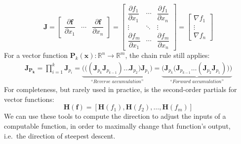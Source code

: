 \documentclass[12pt,initial,twoside,maitrise]{dms}
\numberwithin{equation}{section}
\numberwithin{table}{chapter}
\numberwithin{figure}{chapter}
\begin{document}
\begin{equation}
\mathbf J = \begin{bmatrix}
                       \dfrac{\partial \mathbf{f}}{\partial x_1} & \cdots & \dfrac{\partial \mathbf{f}}{\partial x_n} \end{bmatrix}
= \begin{bmatrix}
      \dfrac{\partial f_1}{\partial x_1} & \cdots & \dfrac{\partial f_1}{\partial x_n}\\
      \vdots & \ddots & \vdots\\
      \dfrac{\partial f_m}{\partial x_1} & \cdots & \dfrac{\partial f_m}{\partial x_n} \end{bmatrix}
    = \begin{bmatrix}
          \nabla f_1 \\
          \vdots \\
          \nabla f_n \end{bmatrix}
\end{equation}
%
For a vector function $\mathbf{P}_k(\mathbf{x}): \mathbb{R}^n\rightarrow\mathbb{R}^m$, the chain rule still applies:
%
\begin{align*}
\mathbf{J}_\mathbf{P_k} = \displaystyle \prod_{i=1}^{k} \mathbf{J}_{p_i} = \underbrace{\bigg(\Big((\mathbf{J}_{p_k} \mathbf{J}_{p_{k-1}}) \dots \mathbf{J}_{p_2}\Big) \mathbf{J}_{p_1}\bigg)}_{\textit{``Reverse accumulation''}} = \underbrace{\bigg(\mathbf{J}_{p_k} \Big(\mathbf{J}_{p_{k-1}} \dots (\mathbf{J}_{p_2} \mathbf{J}_{p_1})\Big)\bigg)}_{\textit{``Forward accumulation''}}
\end{align*}
%
For completeness, but rarely used in practice, is the second-order partials for vector functions:
%
\begin{equation}
\mathbf{H} (\mathbf {f} )=[\mathbf {H} (f_{1}), \mathbf {H} (f_{2}), \dots, \mathbf {H} (f_{m})]
\end{equation}
%
We can use these tools to compute the direction to adjust the inputs of a computable function, in order to maximally change that function's output, i.e.\ the direction of steepest descent.
\end{document}

